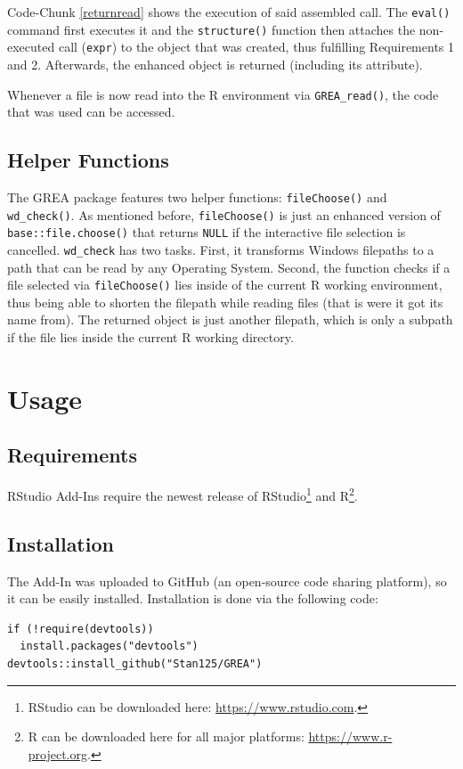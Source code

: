 \documentclass[12pt]{article} %
\newcommand{\li}{\lstinline}
\begin{document}
Code-Chunk \ref{returnread} shows the execution of said assembled call. The \li{eval()} command first executes it and the \li{structure()} function then attaches the non-executed call (\li{expr}) to the object that was created, thus fulfilling Requirements 1 and 2. Afterwards, the enhanced object is returned (including its attribute).

Whenever a file is now read into the R environment via \li{GREA_read()}, the code that was used can be accessed.

\subsection{Helper Functions}
The GREA package features two helper functions: \li{fileChoose()} and \li{wd_check()}. As mentioned before, \li{fileChoose()} is just an enhanced version of \li{base::file.choose()} that returns \li{NULL} if the interactive file selection is cancelled. \li{wd_check} has two tasks. First, it transforms Windows filepaths to a path that can be read by any Operating System. Second, the function checks if a file selected via \li{fileChoose()} lies inside of the current R working environment, thus being able to shorten the filepath while reading files (that is were it got its name from). The returned object is just another filepath, which is only a subpath if the file lies inside the current R working directory. 

\section{Usage}

\subsection{Requirements}

RStudio Add-Ins require the newest release of RStudio\footnote{RStudio can be downloaded here: \url{https://www.rstudio.com}.} and R\footnote{R can be downloaded here for all major platforms: \url{https://www.r-project.org}.}.

\subsection{Installation}
The Add-In was uploaded to GitHub (an open-source code sharing platform), so it can be easily installed. Installation is done via the following code: 
\begin{lstlisting}[caption = Installation of GREA, label = installationcode]
if (!require(devtools))
  install.packages("devtools")
devtools::install_github("Stan125/GREA")
\end{lstlisting}
\end{document}
